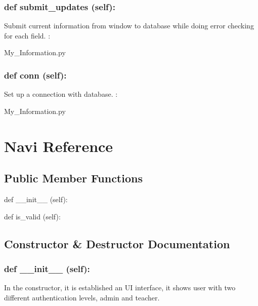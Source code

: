 \hypertarget{class_poly_a14a7ad77ce612b0c54f531d307ee4b39}{
\subsubsection[{def submit_updates (self):}]{\setlength{\rightskip}{0pt plus 5cm}def {submit\_updates} (self):}}\label{class_poly_a14a7ad77ce612b0c54f531d307ee4b39}
Submit current information from window to database while doing error checking for each field.  
:\begin{DoxyCompactItemize}
\item 
My\_Information.\-py\end{DoxyCompactItemize}

\hypertarget{class_poly_a14a7ad77ce612b0c54f531d307ee4b39}{
\subsubsection[{def conn (self):}]{\setlength{\rightskip}{0pt plus 5cm}def {conn} (self):}}\label{class_poly_a14a7ad77ce612b0c54f531d307ee4b39}
Set up a connection with database.
:\begin{DoxyCompactItemize}
\item 
My\_Information.\-py\end{DoxyCompactItemize}


\hypertarget{Navi}{\section{Navi Reference}
\label{Navi}
}
\subsection*{Public Member Functions}
\begin{DoxyCompactItemize}
\item 
def {\_\_init\_\_} (self):
\item 
def {is\_valid} (self):
\end{DoxyCompactItemize}

\subsection{Constructor \& Destructor Documentation}
\hypertarget{class_poly_aa3def076b74bed67904976ad4f9fe9b1}{
\subsubsection[{def __init__ (self):}]{\setlength{\rightskip}{0pt plus 5cm}def {\_\_init\_\_} (self): 
}}
In the constructor, it is established an UI interface, it shows user with two different authentication levels, admin and teacher.

